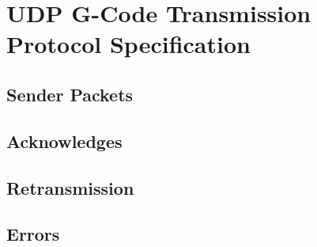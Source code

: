 \chapter{UDP G-Code Transmission Protocol Specification}
	
	\section{Sender Packets}
	
	\section{Acknowledges}
	
	\section{Retransmission}
	
	\section{Errors}
